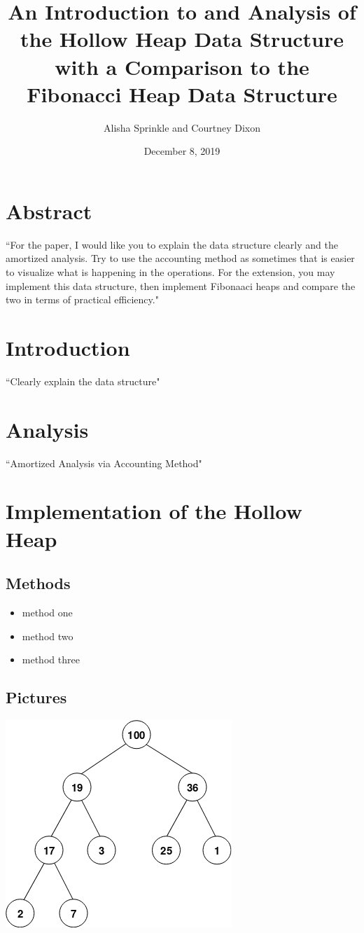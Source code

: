 \documentclass[letter,10pt]{article}
\begin{document}
\title{An Introduction to and Analysis of the Hollow Heap Data Structure with a Comparison to the Fibonacci Heap Data Structure}
\author{Alisha Sprinkle and Courtney Dixon}
\date{December 8, 2019}
\maketitle

\section{Abstract}
``For the paper, I would like you to explain the data structure clearly and the amortized analysis. Try to use the accounting method as sometimes that is easier to visualize what is happening in the operations. For the extension, you may implement this data structure, then implement Fibonaaci heaps and compare the two in terms of practical efficiency."

\section{Introduction}
``Clearly explain the data structure"

\section{Analysis}
``Amortized Analysis via Accounting Method"

\section{Implementation of the Hollow Heap}
\subsection{Methods}
\begin{itemize}
    \item method one
    \item method two
    \item method three
\end{itemize}
\subsection{Pictures}
\begin{center}
\includegraphics{Max-Heap.png}
\end{center}


\newpage
\end{document}
